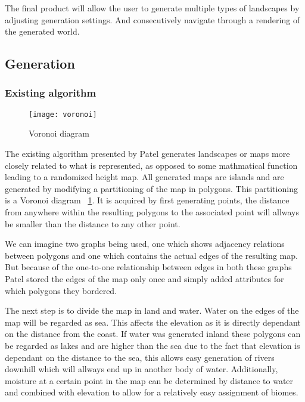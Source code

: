 The final product will allow the user to generate multiple types of landscapes by adjusting generation settings. And consecutively navigate through a rendering of the generated world. 

\subsection{Generation}

\subsubsection{Existing algorithm}

\begin{figure}[H]
	\centering
	\texttt{[image: voronoi]}
	\caption{Voronoi diagram}
	\label{fig:voronoi}
\end{figure}

The existing algorithm presented by Patel\cite{redblob} generates landscapes or maps more closely related to what is represented, as opposed to some mathmatical function leading to a randomized height map. All generated maps are islands and are generated by modifying a partitioning of the map in polygons. This partitioning is a Voronoi diagram ~\ref{fig:voronoi}. It is acquired by first generating points, the distance from anywhere within the resulting polygons to the associated point will allways be smaller than the distance to any other point.

We can imagine two graphs being used, one which shows adjacency relations between polygons and one which contains the actual edges of the resulting map. But because of the one-to-one relationship between edges in both these graphs Patel\cite{redblob} stored the edges of the map only once and simply added attributes for which polygons they bordered.

The next step is to divide the map in land and water. Water on the edges of the map will be regarded as sea. This affects the elevation as it is directly dependant on the distance from the coast. If water was generated inland these polygons can be regarded as lakes and are higher than the sea due to the fact that elevation is dependant on the distance to the sea, this allows easy generation of rivers downhill which will allways end up in another body of water. Additionally, moisture at a certain point in the map can be determined by distance to water and combined with elevation to allow for a relatively easy assignment of biomes.

